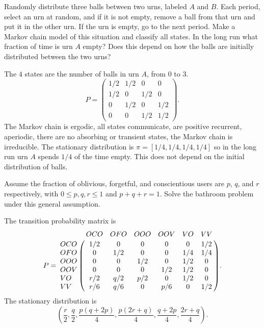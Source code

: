 \documentclass[12pt]{article}
\begin{document}
\begin{exercise}
    Randomly distribute three balls between two urns, labeled \( A \)
    and \( B \).  Each period, select an urn at random, and if it is not
    empty, remove a ball from that urn and put it in the other
    urn. If the urn is empty, go to the next period. Make
    a Markov chain model of this situation and classify all states. In
    the long run what fraction of time is urn \( A \) empty?  Does this
    depend on how the balls are initially distributed between the two
    urns?
\end{exercise}
\begin{solution}
    The \( 4 \) states are the number of balls in urn \( A \), from \( 0
    \) to \( 3 \).
    \[
        P =
        \begin{pmatrix}
            1/2 & 1/2 & 0 & 0 \\
            1/2 & 0 & 1/2 & 0 \\
            0 & 1/2 & 0 & 1/2 \\
            0 & 0 & 1/2 & 1/2
        \end{pmatrix}
        .
    \] The Markov chain is ergodic, all states communicate, are positive
    recurrent, aperiodic, there are no absorbing or transient states,
    the Markov chain is irreducible.  The stationary distribution is \(
    \pi = [1/4, 1/4, 1/4, 1/4] \) so in the long run urn \( A \) spends \(
    1/4 \) of the time empty.  This does not depend on the initial
    distribution of balls.
\end{solution}

\begin{exercise}
    Assume the fraction of oblivious, forgetful, and conscientious users
    are \( p \), \( q \), and \( r \) respectively, with \( 0 \le p,q,r
    \le 1 \) and \( p + q + r = 1 \).  Solve the bathroom problem under
    this general assumption.
\end{exercise}
\begin{solution}
    The transition probability matrix is
    \[
        P= \bordermatrix{ & OCO & OFO & OOO & OOV & VO & VV \cr
        OCO & 1/2 & 0 & 0 & 0 & 0 & 1/2 \cr
        OFO & 0 & 1/2 & 0 & 0 & 1/4 & 1/4 \cr
        OOO & 0 & 0 & 1/2 & 0 & 1/2 & 0 \cr
        OOV & 0 & 0 & 0 & 1/2 & 1/2 & 0 \cr
        VO & r/2 & q/2 & p/2 & 0 & 1/2 & 0 \cr
        VV & r/6 & q/6 & 0 & p/6 & 0 & 1/2 \cr
        }.
    \] The stationary distribution is
    \[
        \left( \frac{r}{2}, \frac{q}{2}, \frac{p(q + 2p)}{4}, \frac{p(2r
        + q)}{4}, \frac{q + 2p}{4}, \frac{2r + q}{4} \right).
    \]
\end{solution}
\end{document}
